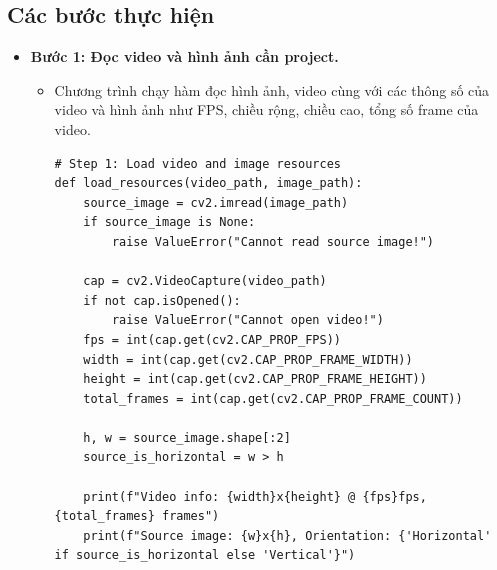      \subsection{Các bước thực hiện}
          \begin{itemize}
               \item \textbf{Bước 1: Đọc video và hình ảnh cần project.}
               \begin{itemize}[label={--}]
                    \item Chương trình chạy hàm đọc hình ảnh, video cùng với các thông số của video và hình ảnh như FPS, chiều rộng, chiều cao, tổng số frame của video.
                    \begin{lstlisting}
# Step 1: Load video and image resources
def load_resources(video_path, image_path):
    source_image = cv2.imread(image_path)
    if source_image is None:
        raise ValueError("Cannot read source image!")

    cap = cv2.VideoCapture(video_path)
    if not cap.isOpened():
        raise ValueError("Cannot open video!")
    fps = int(cap.get(cv2.CAP_PROP_FPS))
    width = int(cap.get(cv2.CAP_PROP_FRAME_WIDTH))
    height = int(cap.get(cv2.CAP_PROP_FRAME_HEIGHT))
    total_frames = int(cap.get(cv2.CAP_PROP_FRAME_COUNT))

    h, w = source_image.shape[:2]
    source_is_horizontal = w > h

    print(f"Video info: {width}x{height} @ {fps}fps, {total_frames} frames")
    print(f"Source image: {w}x{h}, Orientation: {'Horizontal' if source_is_horizontal else 'Vertical'}")


\end{lstlisting}
\end{itemize}
\end{itemize}
